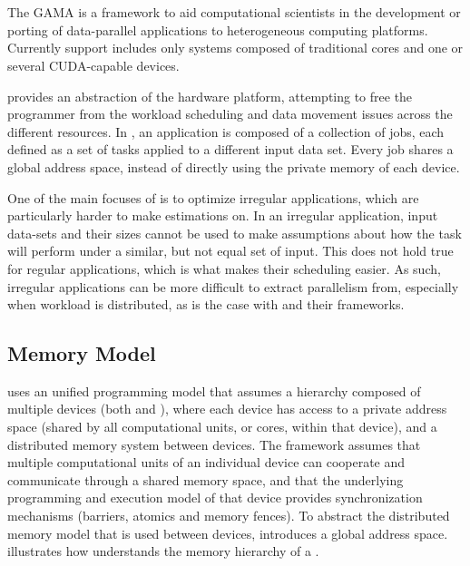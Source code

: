 \documentclass[main.tex]{subfiles}
\begin{document}
\section{\gama} \label{chapter:gama}

The \acf{GAMA} is a framework to aid computational scientists in the development or porting of data-parallel applications to heterogeneous computing platforms. Currently \hetplat support includes only systems composed of traditional \cpus cores and one or several CUDA-capable \gpu devices.

\gama provides an abstraction of the hardware platform, attempting to free the programmer from the workload scheduling and data movement issues across the different resources. In \gama, an application is composed of a collection of jobs, each defined as a set of tasks applied to a different input data set. Every job shares a global address space, instead of directly using the private memory of each device.

One of the main focuses of \gama is to optimize irregular applications, which are particularly harder to make estimations on. In an irregular application, input data-sets and their sizes cannot be used to make assumptions about how the task will perform under a similar, but not equal set of input. This does not hold true for regular applications, which is what makes their scheduling easier. As such, irregular applications can be more difficult to extract parallelism from, especially when workload is distributed, as is the case with \hetplats and their frameworks.


\subsection{Memory Model}

\gama uses an unified programming model that assumes a hierarchy composed of multiple devices (both \cpus and \gpus), where each device has access to a private address space (shared by all computational units, or cores, within that device), and a distributed memory system between devices. The framework assumes that multiple computational units of an individual device can cooperate and communicate through a shared memory space, and that the underlying programming and execution model of that device provides synchronization mechanisms (barriers, atomics and memory fences).
To abstract the distributed memory model that is used between devices, \gama introduces a global address space.  illustrates how \gama understands the memory hierarchy of a \hetplat.
\end{document}
